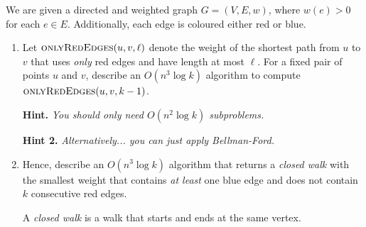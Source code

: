 \documentclass{article}
\begin{document}
\begin{question}
We are given a directed and weighted graph $G = (V, E, w)$, where $w(e) > 0$ for each $e \in E$. Additionally, each edge is coloured either red or blue.

\begin{enumerate}[label = (\alph*)]
    \item Let $\mathsf{\textsc{onlyRedEdges}}(u, v, \ell)$ denote the weight of the shortest path from $u$ to $v$ that uses {\em only} red edges and have length at most $\ell$. For a fixed pair of points $u$ and $v$, describe an $O(n^3 \log k)$ algorithm to compute $\mathsf{\textsc{onlyRedEdges}}(u, v, k - 1)$.

    {\bfseries Hint.} {\em You should only need $O(n^2 \log k)$ subproblems.}

    {\bfseries Hint 2.} {\em Alternatively... you can just apply Bellman-Ford.}

    \item Hence, describe an $O(n^3 \log k)$ algorithm that returns a {\em closed walk} with the smallest weight that contains {\em at least} one blue edge and does not contain $k$ consecutive red edges.

    A {\em closed walk} is a walk that starts and ends at the same vertex.
\end{enumerate}
\end{question}
\end{document}
